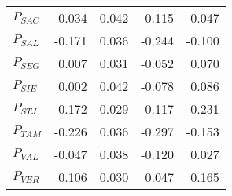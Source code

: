\begin{table}[ht]
\begin{tabular}{lrrrr}
  $P_{SAC}$ & -0.034 & 0.042 & -0.115 & 0.047 \\ 
  $P_{SAL}$ & -0.171 & 0.036 & -0.244 & -0.100 \\ 
  $P_{SEG}$ & 0.007 & 0.031 & -0.052 & 0.070 \\ 
  $P_{SIE}$ & 0.002 & 0.042 & -0.078 & 0.086 \\ 
  $P_{STJ}$ & 0.172 & 0.029 & 0.117 & 0.231 \\ 
  $P_{TAM}$ & -0.226 & 0.036 & -0.297 & -0.153 \\ 
  $P_{VAL}$ & -0.047 & 0.038 & -0.120 & 0.027 \\ 
  $P_{VER}$ & 0.106 & 0.030 & 0.047 & 0.165 \\ 
   \hline
\end{tabular}
\end{table}
